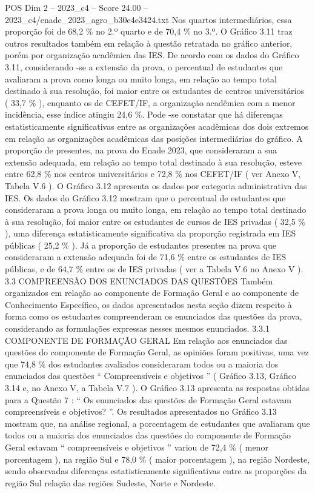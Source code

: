 \begin{textsample}{POS Dim 2 – 2023\_c4 – Score 24.00 – 2023\_c4/enade\_2023\_agro\_b30e4e3424.txt}
Nos quartos intermediários, essa proporção foi de 68,2 \% no 2.º quarto e de 70,4 \% no 3.º.
O Gráfico 3.11 traz outros resultados também em relação à questão retratada no gráfico anterior, porém por organização acadêmica das IES.
De acordo com os dados do Gráfico 3.11, considerando -se a extensão da prova, o percentual de estudantes que avaliaram a prova como longa ou muito longa, em relação ao tempo total destinado à sua resolução, foi maior entre os estudantes de centros universitários ( 33,7 \% ), enquanto os de CEFET/IF, a organização acadêmica com a menor incidência, esse índice atingiu 24,6 \%.
Pode -se constatar que há diferenças estatisticamente significativas entre as organizações acadêmicas dos dois extremos em relação as organizações acadêmicas das posições intermediárias do gráfico.
A proporção de presentes, na prova do Enade 2023, que consideraram a sua extensão adequada, em relação ao tempo total destinado à sua resolução, esteve entre 62,8 \% nos centros universitários e 72,8 \% nos CEFET/IF ( ver Anexo V, Tabela V.6 ).
O Gráfico 3.12 apresenta os dados por categoria administrativa das IES.
Os dados do Gráfico 3.12 mostram que o percentual de estudantes que consideraram a prova longa ou muito longa, em relação ao tempo total destinado à sua resolução, foi maior entre os estudantes de cursos de IES privadas ( 32,5 \% ), uma diferença estatisticamente significativa da proporção registrada em IES públicas ( 25,2 \% ).
Já a proporção de estudantes presentes na prova que consideraram a extensão adequada foi de 71,6 \% entre os estudantes de IES públicas, e de 64,7 \% entre os de IES privadas ( ver a Tabela V.6 no Anexo V ). 3.3 COMPREENSÃO DOS ENUNCIADOS DAS QUESTÕES Também organizados em relação ao componente de Formação Geral e ao componente de Conhecimento Específico, os dados apresentados nesta seção dizem respeito à forma como os estudantes compreenderam os enunciados das questões da prova, considerando as formulações expressas nesses mesmos enunciados. 3.3.1 COMPONENTE DE FORMAÇÃO GERAL Em relação aos enunciados das questões do componente de Formação Geral, as opiniões foram positivas, uma vez que 74,8 \% dos estudantes avaliados consideraram todos ou a maioria dos enunciados das questões “ Compreensíveis e objetivos ” ( Gráfico 3.13, Gráfico 3.14 e, no Anexo V, a Tabela V.7 ).
O Gráfico 3.13 apresenta as respostas obtidas para a Questão 7 : “ Os enunciados das questões de Formação Geral estavam compreensíveis e objetivos? ”.
Os resultados apresentados no Gráfico 3.13 mostram que, na análise regional, a porcentagem de estudantes que avaliaram que todos ou a maioria dos enunciados das questões do componente de Formação Geral estavam “ compreensíveis e objetivos ” variou de 72,4 \% ( menor porcentagem ), na região Sul e 78,0 \% ( maior porcentagem ), na região Nordeste, sendo observadas diferenças estatisticamente significativas entre as proporções da região Sul relação das regiões Sudeste, Norte e Nordeste.

\end{textsample}
